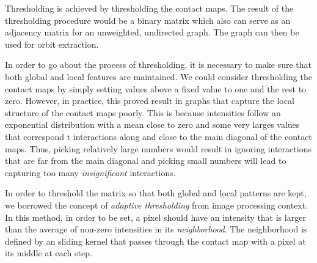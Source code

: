 \documentclass[a4,center,fleqn]{NAR}
\begin{document}
Thresholding is achieved by thresholding the contact maps. The result
of the thresholding procedure would be a binary matrix which also can serve as
an adjacency matrix for an unweighted, undirected graph. The graph can then be
used for orbit extraction.

In order to go about the process of thresholding, it is necessary to make sure
that both global and local features are maintained. We could consider 
thresholding the contact maps by simply setting values above a fixed value to
one and the rest to zero. However, in practice, this proved result in graphs
that capture the local structure of the contact maps poorly. This is because
intensities follow an exponential distribution with a mean close to zero and
some very larges values that correspond t interactions along and close to 
the main diagonal of the contact maps.
Thus, picking relatively large numbers would result in ignoring interactions
that are far from the main diagonal and picking small numbers will lead to
capturing too many \textit{insignificant} interactions.

In order to threshold the matrix so that both global and local patterns are
kept, we borrowed the concept of \textit{adaptive thresholding} from image 
processing context. In this method, in order to be set, a pixel should have
an intensity that is larger than the average of non-zero intensities in its
\textit{neighborhood}. The neighborhood is defined by an sliding kernel 
that passes through the contact map with a pixel at its middle at 
each step.
\end{document}
